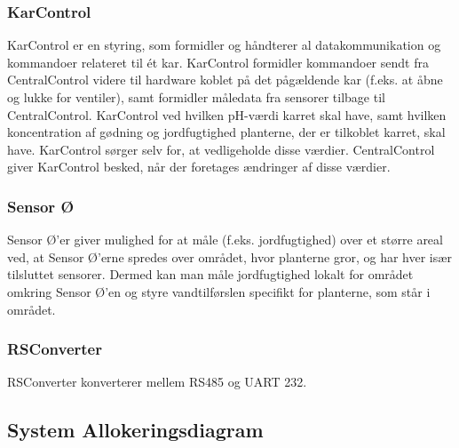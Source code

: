 \subsubsection{KarControl}
KarControl er en styring, som formidler og håndterer al datakommunikation og kommandoer relateret til ét kar. KarControl formidler kommandoer sendt fra CentralControl videre til hardware koblet på det pågældende kar (f.eks. at åbne og lukke for ventiler), samt formidler måledata fra sensorer tilbage til CentralControl. KarControl ved hvilken pH-værdi karret skal have, samt hvilken koncentration af gødning og jordfugtighed planterne, der er tilkoblet karret, skal have. KarControl sørger selv for, at vedligeholde disse værdier. CentralControl giver KarControl besked, når der foretages ændringer af disse værdier.

\subsubsection{Sensor Ø}
Sensor Ø’er giver mulighed for at måle (f.eks. jordfugtighed) over et større areal ved, at Sensor Ø’erne spredes over området, hvor planterne gror, og har hver især tilsluttet sensorer. Dermed kan man måle jordfugtighed lokalt for området omkring Sensor Ø’en og styre vandtilførslen specifikt for planterne, som står i området.

\subsubsection{RSConverter}
RSConverter konverterer mellem RS485 og UART 232.

\subsection{System Allokeringsdiagram}







